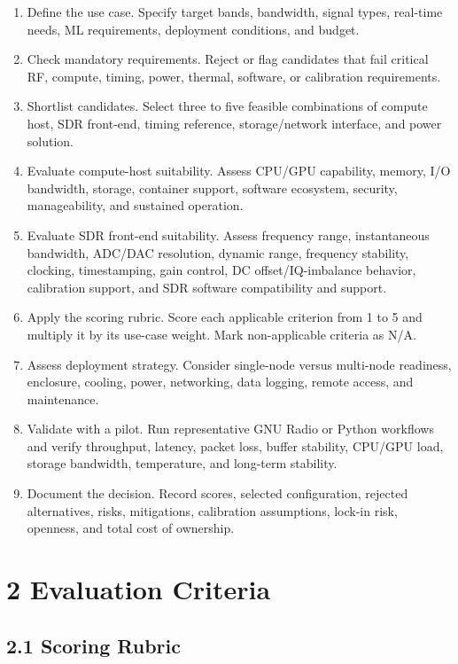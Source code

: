 \documentclass[11pt,a4paper]{article}
\begin{document}
\begin{enumerate}
  \item Define the use case. Specify target bands, bandwidth, signal types, real-time needs, ML requirements, deployment conditions, and budget.
  \item Check mandatory requirements. Reject or flag candidates that fail critical RF, compute, timing, power, thermal, software, or calibration requirements.
  \item Shortlist candidates. Select three to five feasible combinations of compute host, SDR front-end, timing reference, storage/network interface, and power solution.
  \item Evaluate compute-host suitability. Assess CPU/GPU capability, memory, I/O bandwidth, storage, container support, software ecosystem, security, manageability, and sustained operation.
  \item Evaluate SDR front-end suitability. Assess frequency range, instantaneous bandwidth, ADC/DAC resolution, dynamic range, frequency stability, clocking, timestamping, gain control, DC offset/IQ-imbalance behavior, calibration support, and SDR software compatibility and support.
  \item Apply the scoring rubric. Score each applicable criterion from 1 to 5 and multiply it by its use-case weight. Mark non-applicable criteria as N/A.
  \item Assess deployment strategy. Consider single-node versus multi-node readiness, enclosure, cooling, power, networking, data logging, remote access, and maintenance.
  \item Validate with a pilot. Run representative GNU Radio or Python workflows and verify throughput, latency, packet loss, buffer stability, CPU/GPU load, storage bandwidth, temperature, and long-term stability.
  \item Document the decision. Record scores, selected configuration, rejected alternatives, risks, mitigations, calibration assumptions, lock-in risk, openness, and total cost of ownership.
\end{enumerate}

\section*{2 Evaluation Criteria}

\subsection*{2.1 Scoring Rubric}
\end{document}
